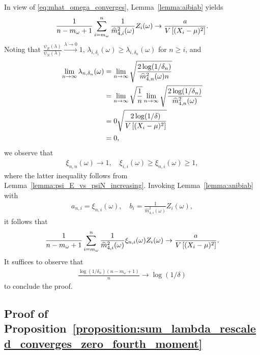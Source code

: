     In view of \eqref{eq:mhat_omega_converges}, Lemma~\ref{lemma:aibiab} yields 
    \begin{align*}
        \frac{1}{n - m_\omega + 1}\sum_{i = m_\omega}^n \frac{1}{\widehat m_{4, i}^2(\omega)}   Z_i(\omega) \to \frac{a}{V \left[ (X_i-\mu)^2\right]}.  
    \end{align*}
    Noting that $\frac{\psi_E(\lambda)}{\psi_N(\lambda)} \stackrel{\lambda \to 0}{\to} 1$, $\lambda_{i,\delta_i}(\omega) \geq \lambda_{i,\delta_n}(\omega)$ for $n \geq i$, and 
    \begin{align*}
        \lim_{n\to\infty}\lambda_{n,\delta_n}(\omega) &= \lim_{n\to\infty}\sqrt\frac{2\log(1/\delta_n)}{\widehat m_{4, n}^2(\omega) n} 
        \\&= \lim_{n\to\infty}\sqrt\frac{1}{ n}\lim_{n\to\infty}\sqrt\frac{2\log(1/\delta_n)}{\widehat m_{4, n}^2(\omega) } 
        \\&= 0\sqrt\frac{2\log(1/\delta)}{V \left[ (X_i-\mu)^2\right]}
        \\&= 0,
    \end{align*}
    we observe that
    \begin{align*}
        \xi_{n, n}(\omega) \to 1, \quad  \xi_{i, i}(\omega) \geq \xi_{n, i} (\omega)\geq 1,
    \end{align*} 
    where the latter inequality follows from Lemma~\ref{lemma:psi_E_vs_psiN_increasing}. Invoking Lemma~\ref{lemma:anibiab} with
    \begin{align*}
        a_{n, i} = \xi_{n, i}(\omega), \quad b_i = \frac{1}{\widehat m_{4, i}^2(\omega)}   Z_i(\omega),
    \end{align*}
    it follows that
    \begin{align*}
        \frac{1}{n - m_\omega + 1}\sum_{i = m_\omega}^n \frac{1}{\widehat m_{4, i}^2(\omega)} \xi_{n, i}(\omega)  Z_i(\omega) \to \frac{a}{V \left[ (X_i-\mu)^2\right]}.
    \end{align*}
    It suffices to observe that
    \begin{align*}
        \frac{\log(1/\delta_n)  (n - m_\omega + 1)}{n} \to  \log(1/\delta)
    \end{align*}
    to conclude the proof.

\subsection{Proof of Proposition~\ref{proposition:sum_lambda_rescaled_converges_zero_fourth_moment}} \label{proof:sum_lambda_rescaled_converges_zero_fourth_moment}

